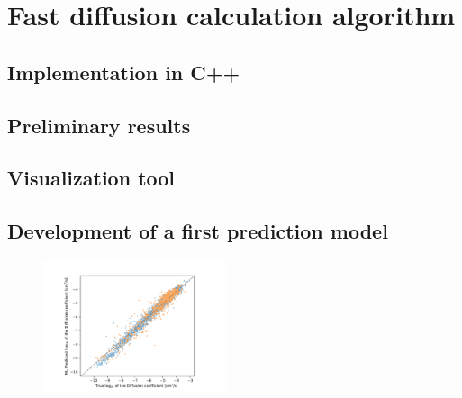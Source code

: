 \documentclass[main]{subfiles}
\begin{document}
\section{Fast diffusion calculation algorithm}

\subsection{Implementation in C++}

\subsection{Preliminary results}

\subsection{Visualization tool}


\subsection{Development of a first prediction model}

\begin{figure}[ht]
  \centering
    \includegraphics[width=0.48\textwidth]{figures/5-diffusion/diffusion_prediction.pdf}
    \caption{}\label{fgr:}
\end{figure}
\end{document}
